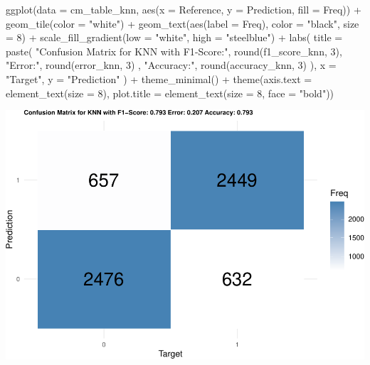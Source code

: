 \documentclass[
]{article}
\newenvironment{Shaded}{\begin{snugshade}}{\end{snugshade}}
\newcommand{\AttributeTok}[1]{\textcolor[rgb]{0.77,0.63,0.00}{#1}}
\newcommand{\DecValTok}[1]{\textcolor[rgb]{0.00,0.00,0.81}{#1}}
\newcommand{\FunctionTok}[1]{\textcolor[rgb]{0.00,0.00,0.00}{#1}}
\newcommand{\NormalTok}[1]{#1}
\newcommand{\SpecialCharTok}[1]{\textcolor[rgb]{0.00,0.00,0.00}{#1}}
\newcommand{\StringTok}[1]{\textcolor[rgb]{0.31,0.60,0.02}{#1}}
\begin{document}
\begin{Shaded}
\begin{Highlighting}[]
\FunctionTok{ggplot}\NormalTok{(}\AttributeTok{data =}\NormalTok{ cm\_table\_knn, }\FunctionTok{aes}\NormalTok{(}\AttributeTok{x =}\NormalTok{ Reference, }\AttributeTok{y =}\NormalTok{ Prediction, }\AttributeTok{fill =}\NormalTok{ Freq)) }\SpecialCharTok{+}
  \FunctionTok{geom\_tile}\NormalTok{(}\AttributeTok{color =} \StringTok{"white"}\NormalTok{) }\SpecialCharTok{+}
  \FunctionTok{geom\_text}\NormalTok{(}\FunctionTok{aes}\NormalTok{(}\AttributeTok{label =}\NormalTok{ Freq), }\AttributeTok{color =} \StringTok{"black"}\NormalTok{, }\AttributeTok{size =} \DecValTok{8}\NormalTok{) }\SpecialCharTok{+}
  \FunctionTok{scale\_fill\_gradient}\NormalTok{(}\AttributeTok{low =} \StringTok{"white"}\NormalTok{, }\AttributeTok{high =} \StringTok{"steelblue"}\NormalTok{) }\SpecialCharTok{+}
  \FunctionTok{labs}\NormalTok{(}
    \AttributeTok{title =} \FunctionTok{paste}\NormalTok{(}
      \StringTok{"Confusion Matrix for KNN with F1{-}Score:"}\NormalTok{,}
      \FunctionTok{round}\NormalTok{(f1\_score\_knn, }\DecValTok{3}\NormalTok{),}
      \StringTok{"Error:"}\NormalTok{,}
      \FunctionTok{round}\NormalTok{(error\_knn, }\DecValTok{3}\NormalTok{) ,}
      \StringTok{"Accuracy:"}\NormalTok{,}
      \FunctionTok{round}\NormalTok{(accuracy\_knn, }\DecValTok{3}\NormalTok{)}
\NormalTok{    ),}
    \AttributeTok{x =} \StringTok{"Target"}\NormalTok{,}
    \AttributeTok{y =} \StringTok{"Prediction"}
\NormalTok{  ) }\SpecialCharTok{+}
  \FunctionTok{theme\_minimal}\NormalTok{() }\SpecialCharTok{+}
  \FunctionTok{theme}\NormalTok{(}\AttributeTok{axis.text =} \FunctionTok{element\_text}\NormalTok{(}\AttributeTok{size =} \DecValTok{8}\NormalTok{),}
        \AttributeTok{plot.title =} \FunctionTok{element\_text}\NormalTok{(}\AttributeTok{size =} \DecValTok{8}\NormalTok{, }\AttributeTok{face =} \StringTok{"bold"}\NormalTok{))}
\end{Highlighting}
\end{Shaded}

\includegraphics{Rain_Australia_files/figure-latex/KNN-1.pdf}
\end{document}
